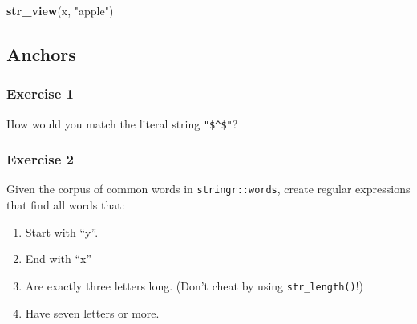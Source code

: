 \documentclass[]{book}
\newenvironment{Shaded}{\begin{snugshade}}{\end{snugshade}}
\newcommand{\CharTok}[1]{\textcolor[rgb]{0.31,0.60,0.02}{#1}}
\newcommand{\KeywordTok}[1]{\textcolor[rgb]{0.13,0.29,0.53}{\textbf{#1}}}
\newcommand{\NormalTok}[1]{#1}
\newcommand{\StringTok}[1]{\textcolor[rgb]{0.31,0.60,0.02}{#1}}
\providecommand{\tightlist}{%
  \setlength{\itemsep}{0pt}\setlength{\parskip}{0pt}}
\theoremstyle{plain}
\theoremstyle{remark}
\theoremstyle{definition}
\theoremstyle{definition}
\theoremstyle{definition}
\theoremstyle{remark}
\begin{document}
\begin{Shaded}
\begin{Highlighting}[]
\KeywordTok{str_view}\NormalTok{(x, }\StringTok{"apple"}\NormalTok{)}
\end{Highlighting}
\end{Shaded}

\begin{Shaded}
\end{Shaded}

\hypertarget{anchors}{%
\subsection{Anchors}\label{anchors}}

\hypertarget{exercise-1-32}{%
\subsubsection{Exercise 1}\label{exercise-1-32}}

How would you match the literal string \texttt{"\$\^{}\$"}?

\begin{Shaded}
\end{Shaded}

\hypertarget{exercise-2-31}{%
\subsubsection{Exercise 2}\label{exercise-2-31}}

Given the corpus of common words in \texttt{stringr::words}, create
regular expressions that find all words that:

\begin{enumerate}
\def\labelenumi{\arabic{enumi}.}
\tightlist
\item
  Start with ``y''.
\item
  End with ``x''
\item
  Are exactly three letters long. (Don't cheat by using
  \texttt{str\_length()}!)
\item
  Have seven letters or more.
\end{enumerate}
\end{document}

